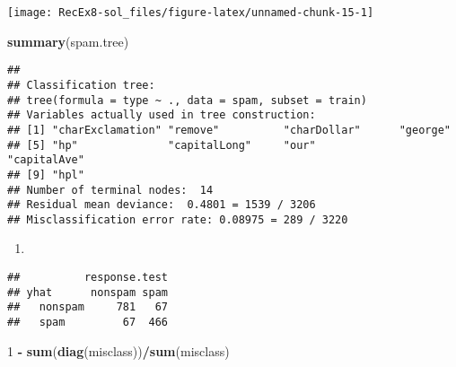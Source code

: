 \documentclass[]{article}
\newenvironment{Shaded}{\begin{snugshade}}{\end{snugshade}}
\newcommand{\DataTypeTok}[1]{\textcolor[rgb]{0.13,0.29,0.53}{#1}}
\newcommand{\DecValTok}[1]{\textcolor[rgb]{0.00,0.00,0.81}{#1}}
\newcommand{\KeywordTok}[1]{\textcolor[rgb]{0.13,0.29,0.53}{\textbf{#1}}}
\newcommand{\NormalTok}[1]{#1}
\newcommand{\OperatorTok}[1]{\textcolor[rgb]{0.81,0.36,0.00}{\textbf{#1}}}
\newcommand{\StringTok}[1]{\textcolor[rgb]{0.31,0.60,0.02}{#1}}
\begin{document}
\texttt{[image: RecEx8-sol\_files/figure-latex/unnamed-chunk-15-1]}

\begin{Shaded}
\begin{Highlighting}[]
\KeywordTok{summary}\NormalTok{(spam.tree)}
\end{Highlighting}
\end{Shaded}

\begin{verbatim}
## 
## Classification tree:
## tree(formula = type ~ ., data = spam, subset = train)
## Variables actually used in tree construction:
## [1] "charExclamation" "remove"          "charDollar"      "george"         
## [5] "hp"              "capitalLong"     "our"             "capitalAve"     
## [9] "hpl"            
## Number of terminal nodes:  14 
## Residual mean deviance:  0.4801 = 1539 / 3206 
## Misclassification error rate: 0.08975 = 289 / 3220
\end{verbatim}

\begin{enumerate}
\def\labelenumi{\alph{enumi})}
\setcounter{enumi}{3}
\item
\end{enumerate}

\begin{Shaded}
\end{Shaded}

\begin{verbatim}
##          response.test
## yhat      nonspam spam
##   nonspam     781   67
##   spam         67  466
\end{verbatim}

\begin{Shaded}
\begin{Highlighting}[]
\DecValTok{1} \OperatorTok{-}\StringTok{ }\KeywordTok{sum}\NormalTok{(}\KeywordTok{diag}\NormalTok{(misclass))}\OperatorTok{/}\KeywordTok{sum}\NormalTok{(misclass)}
\end{Highlighting}
\end{Shaded}
\end{document}
